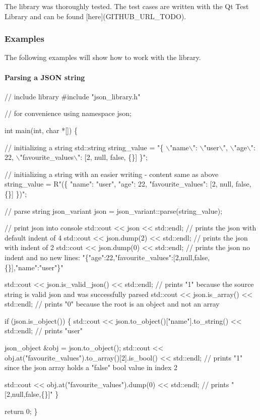 The library was thoroughly tested. The test cases are written with the Qt Test Library and can be found \mbox{[}here\mbox{]}(G\+I\+T\+H\+U\+B\+\_\+\+U\+R\+L\+\_\+\+T\+O\+DO).

\subsubsection*{\label{_expamles_section}%
Examples}

The following examples will show how to work with the library.

\paragraph*{\label{_parsing_json_string_section}%
Parsing a J\+S\+ON string}


\begin{DoxyCode}
// include library
#include "json\_library.h"

// for convenience
using namespace json;

int main(int, char *[]) \{

    // initializing a string
    std::string string\_value = "\{ \(\backslash\)"name\(\backslash\)": \(\backslash\)"user\(\backslash\)", \(\backslash\)"age\(\backslash\)": 22, \(\backslash\)"favourite\_values\(\backslash\)": [2, null, false,
       \{\}] \}";

    // initializing a string with an easier writing - content same as above
    string\_value = R"(\{
        "name": "user",
        "age": 22,
        "favourite\_values": [2, null, false, \{\}]
    \})";

    // parse string
    json\_variant json = json\_variant::parse(string\_value);

    // print json into console
    std::cout << json << std::endl;             // prints the json with default indent of 4
    std::cout << json.dump(2) << std::endl;     // prints the json with indent of 2
    std::cout << json.dump(0) << std::endl;     // prints the json no indent and no new lines:
       "\{"age":22,"favourite\_values":[2,null,false,\{\}],"name":"user"\}"

    std::cout << json.is\_valid\_json() << std::endl; // prints "1" because the source string is valid json
       and was successfully parsed
    std::cout << json.is\_array() << std::endl;      // prints "0" because the root is an object and not an
       array

    if (json.is\_object()) \{
        std::cout << json.to\_object()["name"].to\_string() << std::endl;                 // prints "user"

        json\_object &obj = json.to\_object();
        std::cout << obj.at("favourite\_values").to\_array()[2].is\_bool() << std::endl;   // prints "1" since
       the json array holds a "false" bool value in index 2

        std::cout << obj.at("favourite\_values").dump(0) << std::endl;                   // prints
       "[2,null,false,\{\}]"
    \}

    return 0;
\}
\end{DoxyCode}


